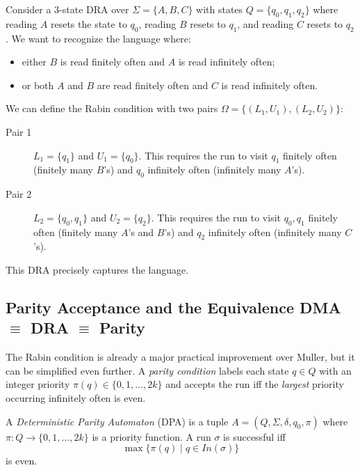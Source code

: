 
\begin{example}
Consider a 3-state DRA over $\Sigma = \{A, B, C\}$ with states $Q = \{q_0, q_1, q_2\}$ where reading $A$ resets the state to $q_0$, reading $B$ resets to $q_1$, and reading $C$ resets to $q_2$.
We want to recognize the language where:
\begin{itemize}
    \item either $B$ is read finitely often and $A$ is read infinitely often;
    \item or both $A$ and $B$ are read finitely often and $C$ is read infinitely often.
\end{itemize}
We can define the Rabin condition with two pairs $\Omega = \{ (L_1, U_1), (L_2, U_2) \}$:
\begin{description}
    \item[Pair 1] $L_1 = \{q_1\}$ and $U_1 = \{q_0\}$. This requires the run to visit $q_1$ finitely often (finitely many $B$'s) and $q_0$ infinitely often (infinitely many $A$'s).
    \item[Pair 2] $L_2 = \{q_0, q_1\}$ and $U_2 = \{q_2\}$. This requires the run to visit $q_0, q_1$ finitely often (finitely many $A$'s and $B$'s) and $q_2$ infinitely often (infinitely many $C$'s).
\end{description}
This DRA precisely captures the language.
\end{example}

\subsection{Parity Acceptance and the Equivalence DMA $\equiv$ DRA $\equiv$ Parity}
\label{subsec:parity-equivalence}

The Rabin condition is already a major practical improvement over Muller, but it can be simplified even further. A \emph{parity condition} labels each state $q \in Q$ with an integer priority $\pi(q) \in \{0, 1, \dots, 2k\}$ and accepts the run iff the \emph{largest} priority occurring infinitely often is even.

\begin{definition}
A \emph{Deterministic Parity Automaton} (DPA) is a tuple $A = (Q, \Sigma, \delta, q_0, \pi)$ where $\pi : Q \to \{0, 1, \dots, 2k\}$ is a priority function. A run $\sigma$ is successful iff
$$\max \{\pi(q) \mid q \in In(\sigma) \}$$
is even.
\end{definition}

